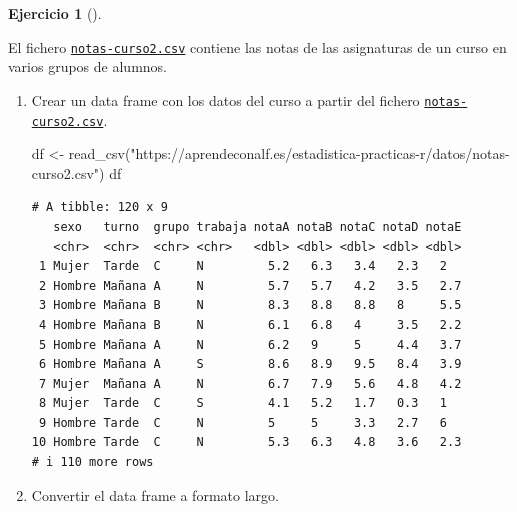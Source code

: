 \documentclass[
  spanish,
  a4paper,
]{scrreport}
\newenvironment{Shaded}{\begin{snugshade}}{\end{snugshade}}
\newcommand{\FunctionTok}[1]{\textcolor[rgb]{0.28,0.35,0.67}{#1}}
\newcommand{\NormalTok}[1]{\textcolor[rgb]{0.00,0.23,0.31}{#1}}
\newcommand{\OtherTok}[1]{\textcolor[rgb]{0.00,0.23,0.31}{#1}}
\newcommand{\StringTok}[1]{\textcolor[rgb]{0.13,0.47,0.30}{#1}}
\theoremstyle{definition}
\newtheorem{exercise}{Ejercicio}[chapter]
\theoremstyle{remark}
\begin{document}
\begin{exercise}[]\protect\hypertarget{exr-preprocesamiento-3}{}\label{exr-preprocesamiento-3}

El fichero \href{datos/notas-curso2.csv}{\texttt{notas-curso2.csv}}
contiene las notas de las asignaturas de un curso en varios grupos de
alumnos.

\begin{enumerate}
\def\labelenumi{\alph{enumi}.}
\item
  Crear un data frame con los datos del curso a partir del fichero
  \href{datos/notas-curso2.csv}{\texttt{notas-curso2.csv}}.

  \begin{tcolorbox}[enhanced jigsaw, titlerule=0mm, arc=.35mm, rightrule=.15mm, opacitybacktitle=0.6, leftrule=.75mm, colframe=quarto-callout-tip-color-frame, toptitle=1mm, breakable, colbacktitle=quarto-callout-tip-color!10!white, bottomrule=.15mm, colback=white, left=2mm, bottomtitle=1mm, opacityback=0, title=\textcolor{quarto-callout-tip-color}{\faLightbulb}\hspace{0.5em}{Solución}, toprule=.15mm, coltitle=black]

\begin{Shaded}
\begin{Highlighting}[]
\NormalTok{df }\OtherTok{\textless{}{-}} \FunctionTok{read\_csv}\NormalTok{(}\StringTok{"https://aprendeconalf.es/estadistica{-}practicas{-}r/datos/notas{-}curso2.csv"}\NormalTok{)}
\NormalTok{df}
\end{Highlighting}
\end{Shaded}

\begin{verbatim}
# A tibble: 120 x 9
   sexo   turno  grupo trabaja notaA notaB notaC notaD notaE
   <chr>  <chr>  <chr> <chr>   <dbl> <dbl> <dbl> <dbl> <dbl>
 1 Mujer  Tarde  C     N         5.2   6.3   3.4   2.3   2  
 2 Hombre Mañana A     N         5.7   5.7   4.2   3.5   2.7
 3 Hombre Mañana B     N         8.3   8.8   8.8   8     5.5
 4 Hombre Mañana B     N         6.1   6.8   4     3.5   2.2
 5 Hombre Mañana A     N         6.2   9     5     4.4   3.7
 6 Hombre Mañana A     S         8.6   8.9   9.5   8.4   3.9
 7 Mujer  Mañana A     N         6.7   7.9   5.6   4.8   4.2
 8 Mujer  Tarde  C     S         4.1   5.2   1.7   0.3   1  
 9 Hombre Tarde  C     N         5     5     3.3   2.7   6  
10 Hombre Tarde  C     N         5.3   6.3   4.8   3.6   2.3
# i 110 more rows
\end{verbatim}

  \end{tcolorbox}
\item
  Convertir el data frame a formato largo.


\end{enumerate}
\end{exercise}
\end{document}
